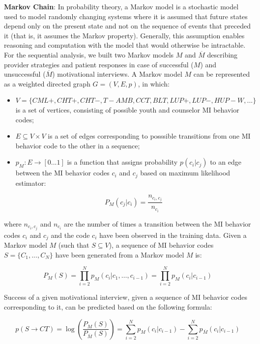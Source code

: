 \documentclass{amia}
\begin{document}
\textbf {Markov Chain}: In probability theory, a Markov model \cite{} is a stochastic model used to model randomly changing systems where it is assumed that future states depend only on the present state and not on the sequence of events that preceded it (that is, it assumes the Markov property). Generally, this assumption enables reasoning and computation with the model that would otherwise be intractable. For the sequential analysis, we built two Markov models $M$ and $\overline{M}$ describing provider strategies and patient responses in case of successful ($M$) and unsuccessful ($\overline{M}$) motivational interviews. A Markov model $M$ can be represented as a weighted directed graph $G = (V, E, p)$, in which:

\begin{itemize}
\item $V = \{CML+, CHT+, CHT-, T-AMB, CCT, BLT, LUP+, LUP-, HUP-W, ...\}$ is a set of vertices, consisting of possible youth and counselor MI behavior codes;
\item $E \subseteq V \times V$ is a set of edges corresponding to posssible transitions from one MI behavior code to the other in a sequence;
\item $p_M:E\rightarrow[0...1]$ is a function that assigns probability $p(c_i|c_j)$ to an edge between the MI behavior codes $c_i$ and $c_j$ based on maximum likelihood estimator:

\begin{equation}
P_M(c_j|c_i) = \frac{n_{c_i,c_j}}{n_{c_i}}
\end{equation}

\end{itemize}

where $n_{c_i,c_j}$ and $n_{c_i}$ are the number of times a transition between the MI behavior codes $c_i$ and $c_j$ and the code $c_i$ have been observed in the training data. Given a Markov model $M$ (such that $S\subseteq V$), a sequence of MI behavior codes $S = \{C_1,...,C_N\}$ have been generated from a Markov model $M$ is:

\begin{equation}
P_M(S) = \prod_{i=2}^N p_M(c_i|c_1,\dots,c_{i-1})=\prod_{i=2}^N p_M(c_i|c_{i-1})
\end{equation}

Success of a given motivational interview, given a sequence of MI behavior codes corresponding to it, can be predicted based on the following formula:

\begin{equation}
p(S\rightarrow CT) = \log\left(\frac{P_M(S)}{P_{\overline M}(S)}\right)= \sum_{i=2}^N p_M(c_i|c_{i-1})-\sum_{i=2}^N p_{\overline M}(c_i|c_{i-1})
\end{equation}
\end{document}
